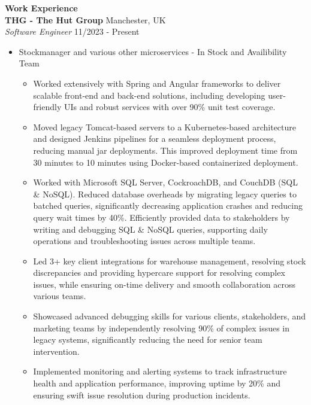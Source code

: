 \documentclass{article}
\begin{document}
\noindent \large \textbf{\textcolor{NavyBlue}{Work Experience}} \vspace{3pt} \\
\noindent \normalsize \textbf{THG - The Hut Group} \hfill Manchester, UK \\
\textit{Software Engineer} \hfill 11/2023 - Present
\begin{itemize}[noitemsep,nolistsep,leftmargin=*]
    \item {\normalsize {Stockmanager and various other microservices - In Stock and Availibility Team }
        \begin{itemize}
            \item Worked extensively with Spring and Angular frameworks to deliver scalable front-end and back-end solutions, including developing user-friendly UIs and robust services with over 90\% unit test coverage.
            \item Moved legacy Tomcat-based servers to a Kubernetes-based architecture and designed Jenkins pipelines for a seamless deployment process, reducing manual jar deployments. This improved deployment time from 30 minutes to 10 minutes using Docker-based containerized deployment.
            \item Worked with Microsoft SQL Server, CockroachDB, and CouchDB (SQL \& NoSQL). Reduced database overheads by migrating legacy queries to batched queries, significantly decreasing application crashes and reducing query wait times by 40\%. Efficiently provided data to stakeholders by writing and debugging SQL \& NoSQL queries, supporting daily operations and troubleshooting issues across multiple teams.
            \item Led 3+ key client integrations for warehouse management, resolving stock discrepancies and providing hypercare support for resolving complex issues, while ensuring on-time delivery and smooth collaboration across various teams.
            \item Showcased advanced debugging skills for various clients, stakeholders, and marketing teams by independently resolving 90\% of complex issues in legacy systems, significantly reducing the need for senior team intervention.
            \item Implemented monitoring and alerting systems to track infrastructure health and application performance, improving uptime by 20\% and ensuring swift issue resolution during production incidents.
        \end{itemize}
    }
\end{itemize}
\end{document}
